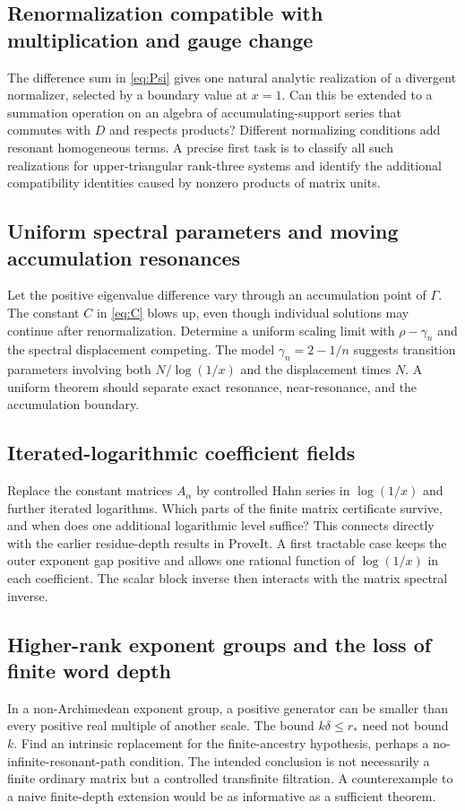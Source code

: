 \documentclass[11pt,a4paper]{article}
\numberwithin{equation}{section}
\theoremstyle{definition}
\theoremstyle{remark}
\newcommand{\G}{\Gamma}
\begin{document}
\subsection{Renormalization compatible with multiplication and gauge change}
The difference sum in \eqref{eq:Psi} gives one natural analytic realization
of a divergent normalizer, selected by a boundary value at $x=1$. Can this
be extended to a summation operation on an algebra of accumulating-support
series that commutes with $D$ and respects products? Different normalizing
conditions add resonant homogeneous terms. A precise first task is to
classify all such realizations for upper-triangular rank-three systems and
identify the additional compatibility identities caused by nonzero
products of matrix units.

\subsection{Uniform spectral parameters and moving accumulation resonances}
Let the positive eigenvalue difference vary through an accumulation point
of $\G$. The constant $C$ in \eqref{eq:C} blows up, even though individual
solutions may continue after renormalization. Determine a uniform scaling
limit with $\rho-\gamma_n$ and the spectral displacement competing. The
model $\gamma_n=2-1/n$ suggests transition parameters involving both
$N/\log(1/x)$ and the displacement times $N$. A uniform theorem should
separate exact resonance, near-resonance, and the accumulation boundary.

\subsection{Iterated-logarithmic coefficient fields}
Replace the constant matrices $A_\alpha$ by controlled Hahn series in
$\log(1/x)$ and further iterated logarithms. Which parts of the finite
matrix certificate survive, and when does one additional logarithmic level
suffice? This connects directly with the earlier residue-depth results in
ProveIt. A first tractable case keeps the outer exponent gap positive and
allows one rational function of $\log(1/x)$ in each coefficient. The
scalar block inverse then interacts with the matrix spectral inverse.

\subsection{Higher-rank exponent groups and the loss of finite word depth}
In a non-Archimedean exponent group, a positive generator can be smaller
than every positive real multiple of another scale. The bound
$k\delta\leq r_*$ need not bound $k$. Find an intrinsic replacement for
the finite-ancestry hypothesis, perhaps a no-infinite-resonant-path
condition. The intended conclusion is not necessarily a finite ordinary
matrix but a controlled transfinite filtration. A counterexample to a naive
finite-depth extension would be as informative as a sufficient theorem.
\end{document}
